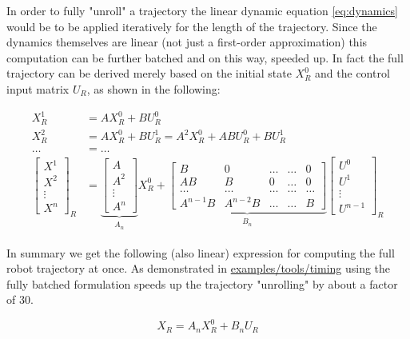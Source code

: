 In order to fully "unroll" a trajectory the linear dynamic equation \ref{eq:dynamics} would be to be applied iteratively for the length of the trajectory. Since the dynamics themselves are linear (not just a first-order approximation) this computation can be further batched and on this way, speeded up. In fact the full trajectory can be derived merely based on the initial state $X_R^0$ and the control input matrix $U_R$, as shown in the following:

\begin{align}
X_R^1 &= A X_R^0 + B U_R^0 \\
X_R^2 &= A X_R^0 + B U_R^1 = A^2 X_R^0 + A B U_R^0 + B U_R^1\\ 
\hdots &= \hdots \\
\begin{bmatrix} X^1 \\ X^2 \\ \vdots \\ X^n \end{bmatrix}_R &= \underbrace{\begin{bmatrix} A \\ A^2 \\ \vdots \\ A^n \end{bmatrix}}_{\substack{A_n}} X_R^0 + \underbrace{\begin{bmatrix} B & 0 & \hdots & \hdots & 0 \\ AB & B & 0 & \hdots & 0 \\ \hdots & \hdots & \hdots & \hdots & \hdots \\ A^{n-1} B & A^{n-2} B & \hdots & \hdots & B \end{bmatrix}}_{\substack{B_n}} \begin{bmatrix} U^0 \\ U^1 \\ \vdots \\ U^{n-1}
\end{bmatrix}_R
\end{align}

In summary we get the following (also linear) expression for computing the full robot trajectory at once. As demonstrated in \href{https://github.com/simon-schaefer/mantrap/blob/master/examples/tools/timing.ipynb}{examples/tools/timing} using the fully batched formulation speeds up the trajectory "unrolling" by about a factor of 30.  

\begin{equation}
X_R = A_n X_R^0 + B_n U_R
\label{eq:dynamics_stacked}
\end{equation}

